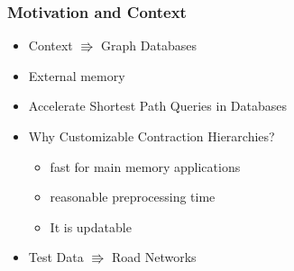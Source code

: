 \begin{frame}
    \frametitle{Motivation and Context}
    \begin{itemize}
        \item Context $\Rrightarrow$ Graph Databases
        \item External memory
        \item Accelerate Shortest Path Queries in Databases 
        \item Why Customizable Contraction Hierarchies? 
        \begin{itemize}
            \item fast for main memory applications
            \item reasonable preprocessing time
            \item It is updatable
        \end{itemize}
        \item Test Data $\Rrightarrow$ Road Networks
    \end{itemize}

\end{frame}